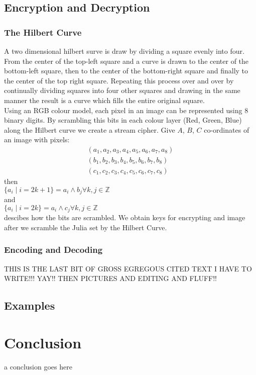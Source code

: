 \documentclass[12pt]{article}
\begin{document}
\subsection{Encryption and Decryption}
{\parindent0pt
\subsubsection{The Hilbert Curve}
A two dimensional hilbert surve is draw by dividing a square evenly into four. From the center of the top-left square and a curve is drawn to the center of the bottom-left square, then to the center of the bottom-right square and finally to the center of the top right square. \cite{algo} Repeating this process over and over by continually dividing squares into four other squares and drawing in the same manner the result is a curve which fills the entire original square. \\

Using an RGB colour model, each pixel in an image can be represented using 8 binary digits. By scrambling this bits in each colour layer (Red, Green, Blue) along the Hilbert curve we create a stream cipher. Give $A$, $B$, $C$ co-ordinates of an image with pixels:
\begin{align*}
 (a_1,a_2,a_3,a_4,a_5,a_6,a_7,a_8) \\
(b_1,b_2,b_3,b_4,b_5,b_6,b_7,b_8) \\
(c_1,c_2,c_3,c_4,c_5,c_6,c_7,c_8)
\end{align*}
then \\
$\{a_i  	\mid  i = 2k+1\}  = a_i \wedge b_j \forall k,j \in \mathbb{Z} $ \\
and \\
$\{a_i  	\mid  i = 2k\}  = a_i \wedge c_j \forall k,j \in \mathbb{Z} $ \\

descibes how the bits are scrambled. \cite{algo} We obtain keys for encrypting and image after we scramble the Julia set by the Hilbert Curve.

\subsubsection{Encoding and Decoding}
THIS IS THE LAST BIT OF GROSS EGREGOUS CITED TEXT I HAVE TO WRITE!!! YAY!! THEN PICTURES AND EDITING AND FLUFF!!
}
\subsection{Examples}


\section{Conclusion}
a conclusion goes here



\end{document}
